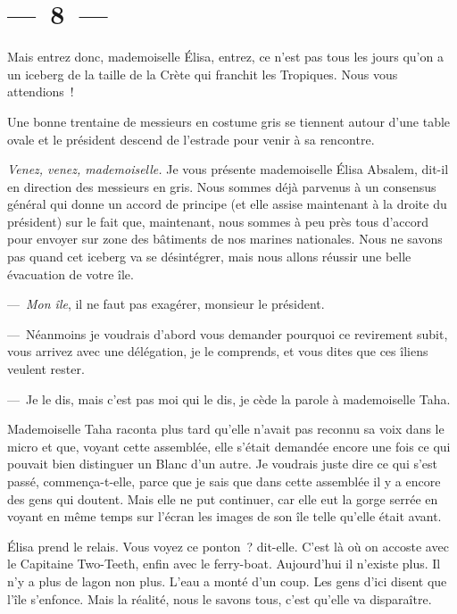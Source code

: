 \documentclass[twoside]{book} %
\begin{document}
\section[{— 8 —}]{— 8 —}
\renewcommand{\leftmark}{— 8 —}

\noindent Mais entrez donc, mademoiselle Élisa, entrez, ce n’est pas tous les jours qu’on a un iceberg de la taille de la Crète qui franchit les Tropiques. Nous vous attendions !\par
Une bonne trentaine de messieurs en costume gris se tiennent autour d’une table ovale et le président descend de l’estrade pour venir à sa rencontre.\par
\emph{Venez, venez, mademoiselle.} Je vous présente mademoi­selle Élisa Absalem, dit-il en direction des messieurs en gris. Nous sommes déjà parvenus à un consensus général qui donne un accord de principe (et elle assise maintenant à la droite du président) sur le fait que, maintenant, nous sommes à peu près tous d’accord pour envoyer sur zone des bâtiments de nos marines nationales. Nous ne savons pas quand cet iceberg va se désintégrer, mais nous allons réussir une belle évacuation de votre île.\par
— \emph{Mon île}, il ne faut pas exagérer, monsieur le président.\par
— Néanmoins je voudrais d’abord vous demander pourquoi ce revire­ment subit, vous arrivez avec une délégation, je le comprends, et vous dites que ces îliens veulent rester.\par
— Je le dis, mais c’est pas moi qui le dis, je cède la parole à mademoi­selle Taha.\par
\bigbreak
\noindent Mademoiselle Taha raconta plus tard qu’elle n’avait pas reconnu sa voix dans le micro et que, voyant cette assemblée, elle s’était demandée encore une fois ce qui pouvait bien distinguer un Blanc d’un autre. Je voudrais juste dire ce qui s’est passé, commença-t-elle, parce que je sais que dans cette assemblée il y a encore des gens qui doutent. Mais elle ne put continuer, car elle eut la gorge serrée en voyant en même temps sur l’écran les images de son île telle qu’elle était avant.\par
Élisa prend le relais. Vous voyez ce ponton ? dit-elle. C’est là où on accoste avec le Capitaine Two-Teeth, enfin avec le ferry-boat. Aujourd’hui il n’existe plus. Il n’y a plus de lagon non plus. L’eau a monté d’un coup. Les gens d’ici disent que l’île s’enfonce. Mais la réalité, nous le savons tous, c’est qu’elle va disparaître.\par
\end{document}
